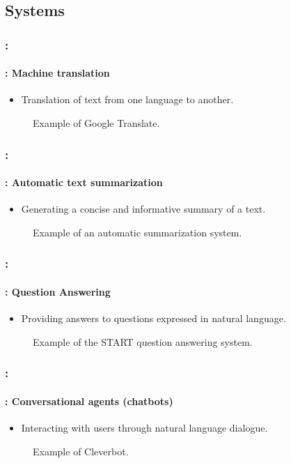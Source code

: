 \documentclass[xcolor=table]{beamer}
\begin{document}
\subsection{Systems}

\begin{frame}
	\frametitle{\insertshortsubtitle: \insertsection}
	\framesubtitle{\insertsubsection: Machine translation}

	\begin{itemize}
		\item Translation of text from one language to another.
	\end{itemize}
	
	\begin{figure}
		\caption{Example of Google Translate.}
	\end{figure}

\end{frame}

\begin{frame}
	\frametitle{\insertshortsubtitle: \insertsection}
	\framesubtitle{\insertsubsection: Automatic text summarization}

	\begin{itemize}
		\item Generating a concise and informative summary of a text.
	\end{itemize}
	
	\begin{figure}
		\caption{Example of an automatic summarization system.}
	\end{figure}

\end{frame}

\begin{frame}
	\frametitle{\insertshortsubtitle: \insertsection}
	\framesubtitle{\insertsubsection: Question Answering}

	\begin{itemize}
		\item Providing answers to questions expressed in natural language.
	\end{itemize}
	
	\begin{figure}
		\caption{Example of the START question answering system.}
	\end{figure}

\end{frame}

\begin{frame}
	\frametitle{\insertshortsubtitle: \insertsection}
	\framesubtitle{\insertsubsection: Conversational agents (chatbots)}

	\begin{itemize}
		\item Interacting with users through natural language dialogue.
	\end{itemize}
	
	\begin{figure}
		\centering
		\caption{Example of Cleverbot.}
	\end{figure}

\end{frame}
\end{document}
